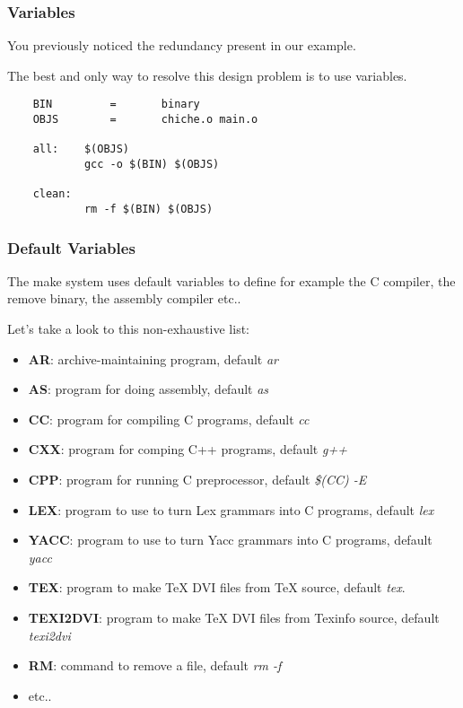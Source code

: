 \documentclass[8pt]{beamer}
\newcommand{\nl}[0]{\vspace{0.4cm}}
\begin{document}

\begin{frame}[containsverbatim]
  \frametitle{Variables}

  You previously noticed the redundancy present in our example.

  \nl

  The best and only way to resolve this design problem is to use variables.

  \nl

  \begin{verbatim}
    BIN         =       binary
    OBJS        =       chiche.o main.o

    all:    $(OBJS)
            gcc -o $(BIN) $(OBJS)

    clean:
            rm -f $(BIN) $(OBJS)
  \end{verbatim}
\end{frame}


\begin{frame}
  \frametitle{Default Variables}

  The make system uses default variables to define for example the C compiler,
  the remove binary, the assembly compiler etc..

  \nl

  Let's take a look to this non-exhaustive list:

  \begin{itemize}
    \item
      \textbf{AR}: archive-maintaining program, default \textit{ar}
    \item
      \textbf{AS}: program for doing assembly, default \textit{as}
    \item
      \textbf{CC}: program for compiling C programs, default \textit{cc}
    \item
      \textbf{CXX}: program for comping C++ programs, default \textit{g++}
    \item
      \textbf{CPP}: program for running C preprocessor, default
      \textit{\$(CC) -E}
    \item
      \textbf{LEX}: program to use to turn Lex grammars into C programs,
      default \textit{lex}
    \item
      \textbf{YACC}: program to use to turn Yacc grammars into C programs,
      default \textit{yacc}
    \item
      \textbf{TEX}: program to make TeX DVI files from TeX source, default
      \textit{tex}.
    \item
      \textbf{TEXI2DVI}: program to make TeX DVI files from Texinfo source,
      default \textit{texi2dvi}
    \item
      \textbf{RM}: command to remove a file, default \textit{rm -f}
    \item
      etc..
  \end{itemize}
\end{frame}
\end{document}
